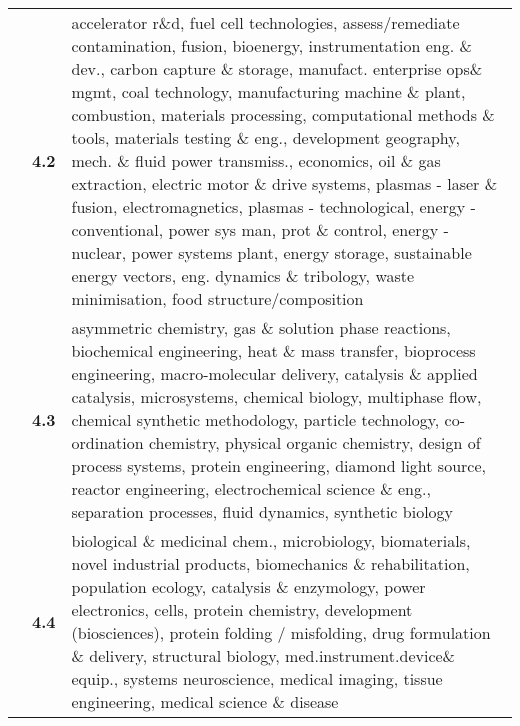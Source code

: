 \begin{spacing}{0.9}
\begin{longtable}[r]{r|r|p{11.5cm}}
& \textbf{4.2} & {accelerator r\&d, fuel cell technologies, assess/remediate contamination, fusion, bioenergy, instrumentation eng. \& dev., carbon capture \& storage, manufact. enterprise ops\& mgmt, coal technology, manufacturing machine \& plant, combustion, materials processing, computational methods \& tools, materials testing \& eng., development geography, mech. \& fluid power transmiss., economics, oil \& gas extraction, electric motor \& drive systems, plasmas - laser \& fusion, electromagnetics, plasmas - technological, energy - conventional, power sys man, prot \& control, energy - nuclear, power systems plant, energy storage, sustainable energy vectors, eng. dynamics \& tribology, waste minimisation, food structure/composition}\\
& \textbf{4.3} & {asymmetric chemistry, gas \& solution phase reactions, biochemical engineering, heat \& mass transfer, bioprocess engineering, macro-molecular delivery, catalysis \& applied catalysis, microsystems, chemical biology, multiphase flow, chemical synthetic methodology, particle technology, co-ordination chemistry, physical organic chemistry, design of process systems, protein engineering, diamond light source, reactor engineering, electrochemical science \& eng., separation processes, fluid dynamics, synthetic biology}\\
& \textbf{4.4} & {biological \& medicinal chem., microbiology, biomaterials, novel industrial products, biomechanics \& rehabilitation, population ecology, catalysis \& enzymology, power electronics, cells, protein chemistry, development (biosciences), protein folding / misfolding, drug formulation \& delivery, structural biology, med.instrument.device\& equip., systems neuroscience, medical imaging, tissue engineering, medical science \& disease}\\
\end{longtable}
\end{spacing}